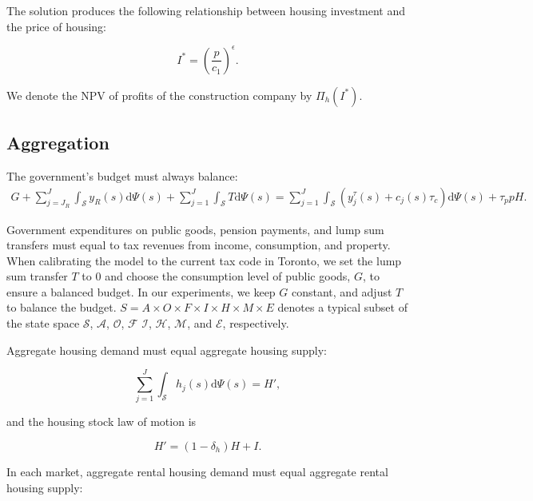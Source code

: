 \documentclass[parskip=full]{article}
\begin{document}
\noindent The solution produces the following relationship between housing investment and the price of housing:

\begin{equation}
\label{eq:construction_company_first_order_condition}
I^{*}=\left(\frac{p}{c_{1}}\right)^{\epsilon}.
\end{equation}

\noindent We denote the NPV of profits of the construction company by $\Pi_{h}(I^{*})$.

\subsection{Aggregation}\label{subsection:aggregation}

The government's budget must always balance:
\begin{align}\label{eq:gbc}
  G + \sum_{j=J_{R}}^J \int_\mathcal{S} y_{R}(s) \mathrm{d}\Psi(s) + \sum_{j=1}^J \int_\mathcal{S} T \mathrm{d}\Psi(s) = \sum_{j=1}^J \int_\mathcal{S}\left(y^{\tau}_{j}(s)+c_{j}(s)\tau_{c}\right) \mathrm{d}\Psi(s)+\tau_{p} p H.
\end{align}

\noindent Government expenditures on public goods, pension payments, and lump sum transfers must equal to tax revenues from income, consumption, and property. When calibrating the model to the current tax code in Toronto, we set the lump sum transfer $T$ to 0 and choose the consumption level of public goods, $G$, to ensure a balanced budget. In our experiments, we keep $G$ constant, and adjust $T$ to balance the budget. $S=A\times O \times F \times I \times H \times M \times E$ denotes a typical subset of the state space $\mathcal{S}$, $\mathcal{A}$, $\mathcal{O}$, $\mathcal{F}$ $\mathcal{I}$, $\mathcal{H}$, $\mathcal{M}$, and $\mathcal{E}$, respectively.

Aggregate housing demand must equal aggregate housing supply:

\begin{equation}
\label{eq:housing_clearing_condition}
  \sum_{j=1}^J \int_\mathcal{S} h_{j}(s) \mathrm{d}\Psi(s) = H',
\end{equation}

\noindent and the housing stock law of motion is 

\begin{equation}\label{eq:housing_stock_lom}
H'=(1-\delta_h)H + I.
\end{equation}

\noindent In each market, aggregate rental housing demand must equal aggregate rental housing supply:
\end{document}

